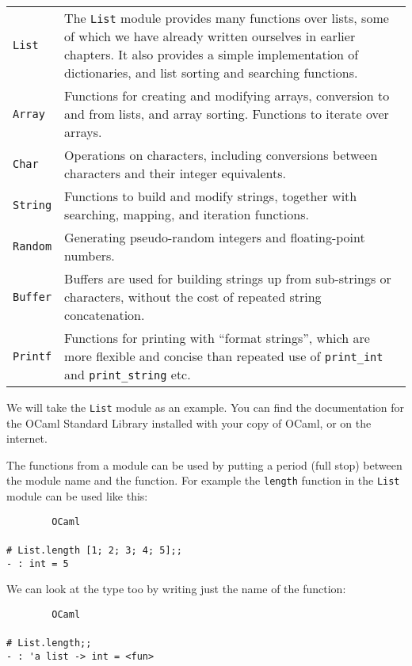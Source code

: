 \documentclass[]{book}
\renewcommand{\arraystretch}{1.2}
\newcommand{\smspace}{\vspace{4mm}}
\begin{document}
\smspace
\bgroup
\def\arraystretch{1.2}
\noindent\begin{tabular}{@{}lp{}@{}} \toprule
  \texttt{List} & The \texttt{List} module provides many functions over lists, some of which we have already written ourselves in earlier chapters. It also provides a simple implementation of dictionaries, and list sorting and searching functions.\\
  \texttt{Array} & Functions for creating and modifying arrays, conversion to and from lists, and array sorting. Functions to iterate over arrays. \\
  \texttt{Char} & Operations on characters, including conversions between characters and their integer equivalents.\\
  \texttt{String} & Functions to build and modify strings, together with searching, mapping, and iteration functions.\\
  \texttt{Random} & Generating pseudo-random integers and floating-point numbers.\\
  \texttt{Buffer} & Buffers are used for building strings up from sub-strings or characters, without the cost of repeated string concatenation.\\
  \texttt{Printf} & Functions for printing with ``format strings'', which are more flexible and concise than repeated use of \texttt{print\_int} and \texttt{print\_string} etc.\\ \bottomrule
\end{tabular}
\egroup
\smspace

\noindent We will take the \texttt{List} module as an example. You can find the documentation for the OCaml Standard Library installed with your copy of OCaml, or on the internet.

The functions from a module can be used by putting a period (full stop) between the module name and the function. For example the \texttt{length} function in the \texttt{List} module can be used like this:

\smspace
\noindent\verb!        OCaml!\\
\noindent\\
\noindent\texttt{\# List.length [1; 2; 3; 4; 5];;}\\
\noindent\verb!- : int = 5!
\smspace

\noindent We can look at the type too by writing just the name of the function:

\smspace
\noindent\verb!        OCaml!\\
\noindent\\
\noindent\texttt{\# List.length;;}\\
\noindent\verb!- : 'a list -> int = <fun>!
\smspace
\end{document}
